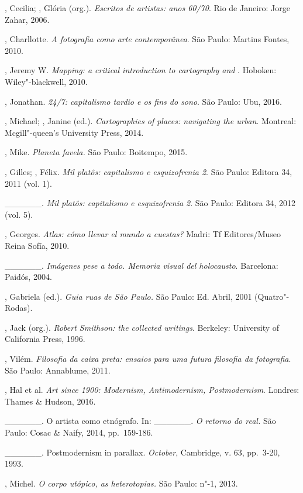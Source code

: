 \begin{Parskip}
, Cecilia; , Glória (org.). \emph{Escritos de artistas:
anos 60/70}. Rio de Janeiro: Jorge Zahar, 2006.

, Charllotte. \emph{A fotografia como arte contemporânea}. São
Paulo: Martins Fontes, 2010.

, Jeremy W. \emph{Mapping: a critical introduction to
cartography and }. Hoboken: Wiley"-blackwell, 2010.

, Jonathan. \emph{24/7: capitalismo tardio e os fins do sono}.
São Paulo: Ubu, 2016.

, Michael; , Janine (ed.). \emph{Cartographies of
places: navigating the urban}. Montreal: Mcgill"-queen's University
Press, 2014.

, Mike. \emph{Planeta favela.} São Paulo: Boitempo, 2015.

, Gilles; , Félix. \emph{Mil platôs: capitalismo e
esquizofrenia 2}. São Paulo: Editora 34, 2011 (vol. 1).

\_\_\_\_\_\_. \emph{Mil platôs: capitalismo e esquizofrenia 2}.
São Paulo: Editora 34, 2012 (vol. 5).

, Georges. \emph{Atlas: cómo llevar el mundo a cuestas?}
Madri: Tf Editores/Museo Reina Sofía, 2010.

\_\_\_\_\_\_. \emph{Imágenes pese a todo. Memoria visual del holocausto}. Barcelona: Paidós, 2004.

, Gabriela (ed.). \emph{Guia ruas de São Paulo.} São Paulo: Ed.
Abril, 2001 (Quatro"-Rodas).

, Jack (org.). \emph{Robert Smithson: the collected writings}.
Berkeley: University of California Press, 1996.

, Vilém. \emph{Filosofia da caixa preta: ensaios para uma
futura filosofia da fotografia}. São Paulo: Annablume, 2011.

, Hal et al. \emph{Art since 1900: Modernism, Antimodernism,
Postmodernism}. Londres: Thames \& Hudson, 2016.

\_\_\_\_\_\_. O artista como etnógrafo. In: \_\_\_\_\_\_.
\emph{O retorno do real.} São Paulo: Cosac \& Naify, 2014, pp.~159-186.

\_\_\_\_\_\_. Postmodernism in parallax. \emph{October},
Cambridge, v. 63, pp.~3-20, 1993.

, Michel. \emph{O corpo utópico, as heterotopias.} São Paulo:
n"-1, 2013.


\end{Parskip}
